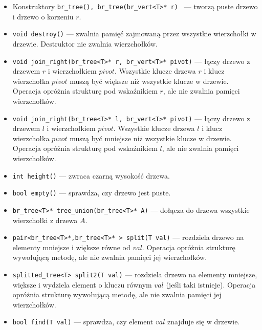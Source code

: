\documentclass[declaration,shortabstract]{iithesis}
\theoremstyle{thm}
\theoremstyle{remark}
\theoremstyle{plain}
\theoremstyle{plain}
\theoremstyle{plain}
\begin{document}
\begin{itemize}

\item{Konstruktory \texttt{br\_tree(), br\_tree(br\_vert<T>* r) } --- tworzą puste drzewo i drzewo o korzeniu $r$.}

\item{\texttt{void destroy()} --- zwalnia pamięć zajmowaną przez wszystkie wierzchołki w drzewie. Destruktor nie zwalnia wierzchołków.}

\item{\texttt{void join\_right(br\_tree<T>* r, br\_vert<T>* pivot)} --- łączy drzewo z drzewem $r$ i wierzchołkiem $pivot$. Wszystkie klucze drzewa $r$ i klucz wierzchołka $pivot$ muszą być większe niż wszystkie klucze w drzewie. Operacja opróżnia strukturę pod wskaźnikiem $r$, ale nie zwalnia pamięci wierzchołków.}

\item{\texttt{void join\_right(br\_tree<T>* l, br\_vert<T>* pivot)} --- łączy drzewo z drzewem $l$ i wierzchołkiem $pivot$. Wszystkie klucze drzewa $l$ i klucz wierzchołka $pivot$ muszą być mniejsze niż wszystkie klucze w drzewie. Operacja opróżnia strukturę pod wskaźnikiem $l$, ale nie zwalnia pamięci wierzchołków.}

\item{\texttt{int height()} --- zwraca czarną wysokość drzewa.}
 
\item{\texttt{bool empty()} --- sprawdza, czy drzewo jest puste.}

\item{\texttt{br\_tree<T>* tree\_union(br\_tree<T>* A)} --- dołącza do drzewa wszystkie wierzchołki z drzewa $A$.}

\item{\texttt{pair<br\_tree<T>*,br\_tree<T>* > split(T val)} --- rozdziela drzewo na elementy mniejsze i większe równe od $val$. Operacja opróżnia strukturę wywołującą metodę, ale nie zwalnia pamięci jej wierzchołków.}

\item{\texttt{splitted\_tree<T> split2(T val)} --- rozdziela drzewo na elementy mniejsze, większe i wydziela element o kluczu równym $val$ (jeśli taki istnieje). Operacja opróżnia strukturę wywołującą metodę, ale nie zwalnia pamięci jej wierzchołków.}

\item{\texttt{bool find(T val)} --- sprawdza, czy element $val$ znajduje się w drzewie.}
    

\end{itemize}
\end{document}
